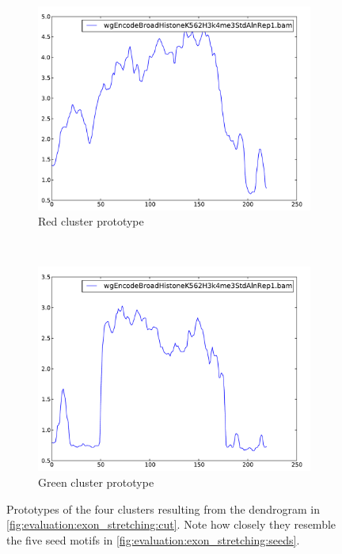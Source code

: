 \documentclass[parskip]{cs4rep}
\begin{document}
\begin{figure}[t]
    ~
    \begin{subfigure}[b]{0.22\textwidth}
        \includegraphics[width=\textwidth]{figures/evaluation/exon_stretching/cluster-4.pdf}
        \caption{Red cluster prototype}
        \label{fig:evaluation:exon_stretching:clusters:3:prototype}
    \end{subfigure}
    ~
    \begin{subfigure}[b]{0.22\textwidth}
        \includegraphics[width=\textwidth]{figures/evaluation/exon_stretching/cluster-3.pdf}
        \caption{Green cluster prototype}
        \label{fig:evaluation:exon_stretching:clusters:4:prototype}
    \end{subfigure}
    \caption{Prototypes of the four clusters resulting from the dendrogram in \autoref{fig:evaluation:exon_stretching:cut}. Note how closely they resemble the five seed motifs in \autoref{fig:evaluation:exon_stretching:seeds}.}
    \label{fig:evaluation:exon_stretching:clusters:prototypes}
\end{figure}
\end{document}
